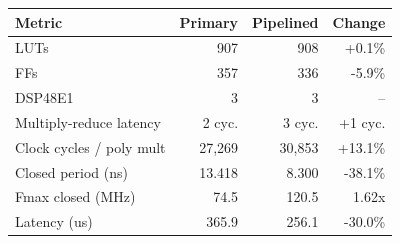 \begin{tabular}{@{}lrrr@{}}
\toprule
Metric & Primary & Pipelined & Change \\
\midrule
LUTs & 907 & 908 & +0.1\% \\
FFs & 357 & 336 & -5.9\% \\
DSP48E1 & 3 & 3 & -- \\
Multiply-reduce latency & 2 cyc. & 3 cyc. & +1 cyc. \\
Clock cycles / poly mult & 27,269 & 30,853 & +13.1\% \\
Closed period (ns) & 13.418 & 8.300 & -38.1\% \\
Fmax closed (MHz) & 74.5 & 120.5 & 1.62x \\
Latency (us) & 365.9 & 256.1 & -30.0\% \\
\bottomrule
\end{tabular}
